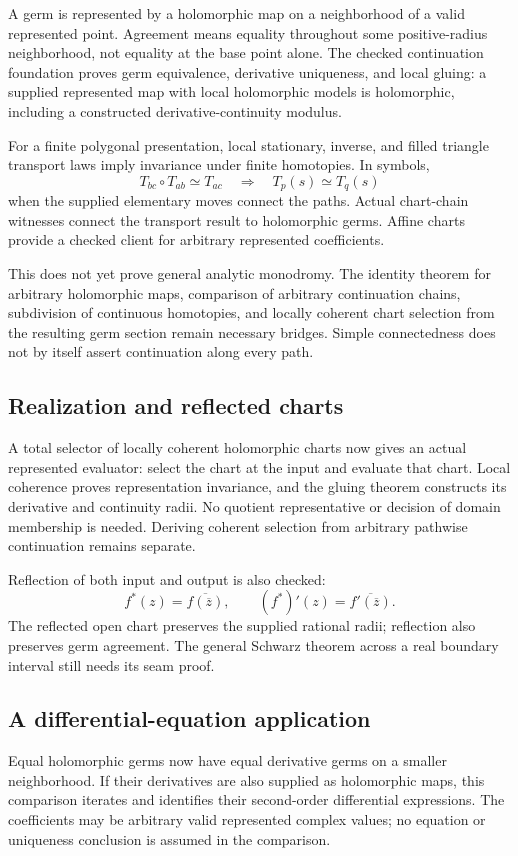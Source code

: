 A germ is represented by a holomorphic map on a neighborhood of a valid
represented point. Agreement means equality throughout some positive-radius
neighborhood, not equality at the base point alone. The checked continuation
foundation proves germ equivalence, derivative uniqueness, and local gluing:
a supplied represented map with local holomorphic models is holomorphic,
including a constructed derivative-continuity modulus.

For a finite polygonal presentation, local stationary, inverse, and filled
triangle transport laws imply invariance under finite homotopies. In symbols,
\[
 T_{bc}\circ T_{ab}\simeq T_{ac}
 \quad\Longrightarrow\quad T_p(s)\simeq T_q(s)
\]
when the supplied elementary moves connect the paths. Actual chart-chain
witnesses connect the transport result to holomorphic germs. Affine charts
provide a checked client for arbitrary represented coefficients.

This does not yet prove general analytic monodromy. The identity theorem for
arbitrary holomorphic maps, comparison of arbitrary continuation chains,
subdivision of continuous homotopies, and locally coherent chart selection
from the resulting germ section remain necessary bridges. Simple connectedness does not by
itself assert continuation along every path.


\subsection{Realization and reflected charts}
A total selector of locally coherent holomorphic charts now gives an actual
represented evaluator: select the chart at the input and evaluate that chart.
Local coherence proves representation invariance, and the gluing theorem
constructs its derivative and continuity radii. No quotient representative
or decision of domain membership is needed. Deriving coherent selection from
arbitrary pathwise continuation remains separate.

Reflection of both input and output is also checked:
\[
 f^*(z)=\overline{f(\overline z)},\qquad
 (f^*)'(z)=\overline{f'(\overline z)}.
\]
The reflected open chart preserves the supplied rational radii; reflection
also preserves germ agreement. The general Schwarz theorem across a real
boundary interval still needs its seam proof.

\subsection{A differential-equation application}
Equal holomorphic germs now have equal derivative germs on a smaller
neighborhood. If their derivatives are also supplied as holomorphic maps,
this comparison iterates and identifies their second-order differential
expressions. The coefficients may be arbitrary valid represented complex
values; no equation or uniqueness conclusion is assumed in the comparison.

